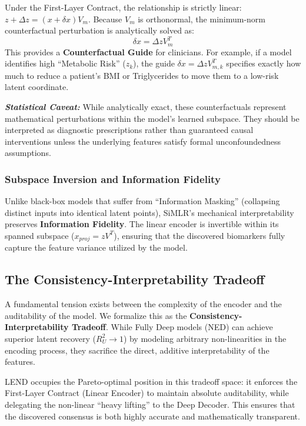 \documentclass[
  letterpaper,
]{report}
\begin{document}
Under the First-Layer Contract, the relationship is strictly linear:
\(z + \Delta z = (x + \delta x) V_m\). Because \(V_m\) is orthonormal,
the minimum-norm counterfactual perturbation is analytically solved as:
\[ \delta x = \Delta z V_m^T \] This provides a \textbf{Counterfactual
Guide} for clinicians. For example, if a model identifies high
``Metabolic Risk'' (\(z_k\)), the guide
\(\delta x = \Delta z V_{m,k}^T\) specifies exactly how much to reduce a
patient's BMI or Triglycerides to move them to a low-risk latent
coordinate.

\textbf{\emph{Statistical Caveat:}} While analytically exact, these
counterfactuals represent mathematical perturbations within the model's
learned subspace. They should be interpreted as diagnostic prescriptions
rather than guaranteed causal interventions unless the underlying
features satisfy formal unconfoundedness assumptions.

\subsubsection{Subspace Inversion and Information
Fidelity}\label{subspace-inversion-and-information-fidelity}

Unlike black-box models that suffer from ``Information Masking''
(collapsing distinct inputs into identical latent points), SiMLR's
mechanical interpretability preserves \textbf{Information Fidelity}. The
linear encoder is invertible within its spanned subspace
(\(x_{proj} = z V^T\)), ensuring that the discovered biomarkers fully
capture the feature variance utilized by the model.

\subsection{The Consistency-Interpretability
Tradeoff}\label{the-consistency-interpretability-tradeoff}

A fundamental tension exists between the complexity of the encoder and
the auditability of the model. We formalize this as the
\textbf{Consistency-Interpretability Tradeoff}. While Fully Deep models
(NED) can achieve superior latent recovery (\(R^2_U \to 1\)) by modeling
arbitrary non-linearities in the encoding process, they sacrifice the
direct, additive interpretability of the features.

LEND occupies the Pareto-optimal position in this tradeoff space: it
enforces the First-Layer Contract (Linear Encoder) to maintain absolute
auditability, while delegating the non-linear ``heavy lifting'' to the
Deep Decoder. This ensures that the discovered consensus is both highly
accurate and mathematically transparent.
\end{document}
